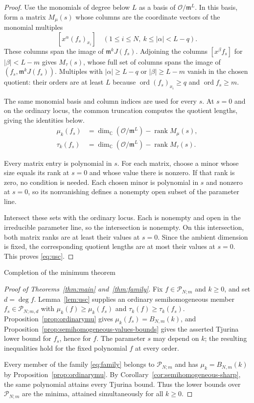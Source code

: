 \documentclass[12pt,reqno]{amsart}
\makeatletter
\renewcommand\subsection{\@startsection{subsection}{2}%
  \z@{.8\linespacing\@plus.3\linespacing}{.35\linespacing}%
  {\normalfont\bfseries}}
\newcommand{\C}{\mathbb C}
\newcommand{\mm}{\mathfrak m}
\newcommand{\ord}{\operatorname{ord}}
\newcommand{\rank}{\operatorname{rank}}
\newcommand{\Pclass}{\mathcal P_{N;m,d}}
\newcommand{\Pall}{\mathcal P_{N;m}}
\newcommand{\OO}{\mathcal O}
\theoremstyle{definition}
\makeatother
\begin{document}
\begin{proof}
Use the monomials of degree below $L$ as a basis of $\OO/\mm^L$.
In this basis, form a matrix $M_\mu(s)$ whose columns are the
coordinate vectors of the monomial multiples
\[
 [x^\alpha(f_s)_{x_i}]\quad
 (1\leq i\leq N,\ k\leq|\alpha|<L-q).
\]
These columns span the image of $\mm^kJ(f_s)$. Adjoining the
columns $[x^\beta f_s]$ for $|\beta|<L-m$ gives $M_\tau(s)$,
whose full set of columns spans the image of $(f_s,\mm^kJ(f_s))$.
Multiples with $|\alpha|\geq L-q$ or $|\beta|\geq L-m$ vanish
in the chosen quotient: their orders are at least $L$ because
$\ord (f_s)_{x_i}\geq q$ and $\ord f_s\geq m$.

 
The same monomial basis and column indices are used for every $s$.
At $s=0$ and on the ordinary locus, the common truncation computes
the quotient lengths, giving the identities below. 
\[
 \begin{aligned}
 \mu_k(f_s)&=\dim_\C(\OO/\mm^L)-\rank M_\mu(s),\\
 \tau_k(f_s)&=\dim_\C(\OO/\mm^L)-\rank M_\tau(s).
 \end{aligned}
\]

 
Every matrix entry is polynomial in $s$.
For each matrix, choose a minor whose size equals its rank at
$s=0$ and whose value there is nonzero. If that rank is zero, no
condition is needed. Each chosen minor is polynomial in $s$ and
nonzero at $s=0$, so its nonvanishing defines a nonempty open
subset of the parameter line.

Intersect these sets with the ordinary locus. Each is nonempty and
open in the irreducible parameter line, so the intersection is
nonempty. On this intersection, both matrix ranks are at least
their values at $s=0$. Since the ambient dimension is fixed, the
corresponding quotient lengths are at most their values at $s=0$.
This proves
\eqref{eq:usc}.
\end{proof}

\subsection{Completion of the minimum theorem}

\begin{proof}[Proof of Theorems~\ref{thm:main} and~\ref{thm:family}]
Fix $f\in\Pall$ and $k\geq0$, and set $d=\deg f$.
Lemma~\ref{lem:usc} supplies an ordinary semihomogeneous member
$f_s\in\Pclass$ with $\mu_k(f)\geq\mu_k(f_s)$ and
$\tau_k(f)\geq\tau_k(f_s)$.
Proposition~\ref{prop:ordinarymu} gives $\mu_k(f_s)=B_{N,m}(k)$, and
Proposition~\ref{prop:semihomogeneous-values-bounds} gives the asserted
Tjurina lower bound for $f_s$, hence for $f$.
The parameter $s$ may depend on $k$; the resulting inequalities hold
for the fixed polynomial $f$ at every order.
\par
Every member of the family \eqref{eq:family} belongs to $\Pall$ and
has $\mu_k=B_{N,m}(k)$ by Proposition~\ref{prop:ordinarymu}. By
Corollary~\ref{cor:semihomogeneous-sharp}, the same polynomial attains
every Tjurina bound. Thus the lower bounds over $\Pall$ are the minima,
attained simultaneously for all $k\geq0$.
\end{proof}
\end{document}
